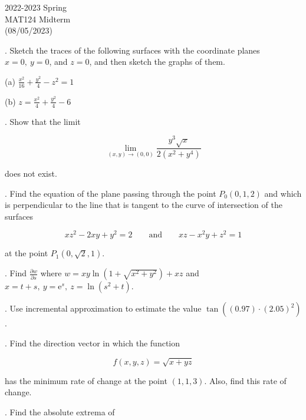 \documentclass{article}
\begin{document}
\pagestyle{empty}
\large

\begin{center}
2022-2023 Spring \\MAT124 Midterm\\(08/05/2023)
\end{center}

. Sketch the traces of the following surfaces with the coordinate planes $x=0,\:y=0$, and $z=0$, and then sketch the graphs of them.

\hfill

\noindent (a) $\displaystyle\frac{x^2}{16}+\frac{y^2}4-z^2=1$

\hfill

\noindent (b) $\displaystyle z=\frac{x^2}4+\frac{y^2}4-6$

\hfill

. Show that the limit

\[\lim_{(x,y)\to(0,0)}\frac{y^3\sqrt x}{2\left(x^2+y^4\right)}\]

\hfill

\noindent does not exist.

\hfill

. Find the equation of the plane passing through the point $P_0(0,1,2)$ and which is perpendicular to the line that is tangent to the curve of intersection of the surfaces

\[xz^2-2xy+y^2=2\qquad\text{and}\qquad xz-x^2y+z^2=1\]

\hfill

\noindent at the point $P_1\left(0,\sqrt2, 1\right)$.

\hfill

. Find $\displaystyle\frac{\partial w}{\partial s}$ where $w=xy\ln\left(1+\sqrt{x^2+y^2}\right)+xz$ and $x=t+s,\:y=\mathrm{e}^s,\:z=\ln\left(s^2+t\right)$.

\hfill

. Use incremental approximation to estimate the value $\tan\left((0.97)\cdot(2.05)^2\right)$.

\hfill

. Find the direction vector in which the function

\[f(x,y,z)=\sqrt{x+yz}\]

\hfill

\noindent has the minimum rate of change at the point $(1,1,3)$. Also, find this rate of change.

\hfill


. Find the absolute extrema of
\end{document}
